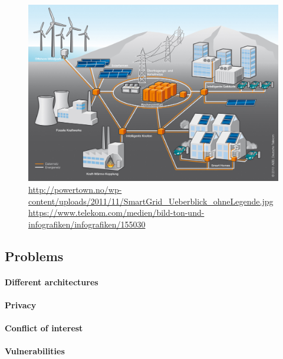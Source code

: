 \begin{figure}
	\includegraphics[width=\textwidth]{figures/SmartGrid_Ueberblick_ohneLegende.jpg}
	\caption{\url{http://powertown.no/wp-content/uploads/2011/11/SmartGrid_Ueberblick_ohneLegende.jpg} \url{https://www.telekom.com/medien/bild-ton-und-infografiken/infografiken/155030}}
	\label{fig:background:smartgrid}
\end{figure}\textsl{}

\subsection{Problems}

\paragraph{Different architectures}

\paragraph{Privacy}

\paragraph{Conflict of interest}

\paragraph{Vulnerabilities}
